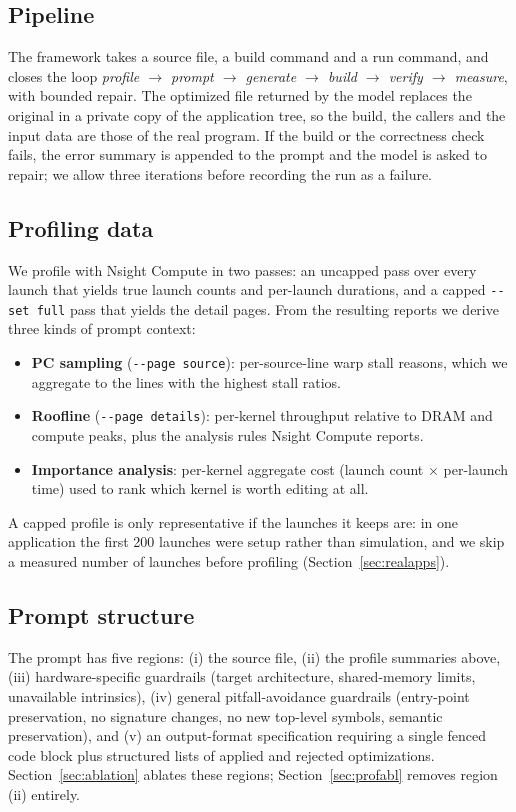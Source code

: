 \subsection{Pipeline}
The framework takes a source file, a build command and a run command, and closes the loop
\emph{profile $\rightarrow$ prompt $\rightarrow$ generate $\rightarrow$ build $\rightarrow$ verify
$\rightarrow$ measure}, with bounded repair. The optimized file returned by the model replaces the
original in a private copy of the application tree, so the build, the callers and the input data are
those of the real program. If the build or the correctness check fails, the error summary is appended
to the prompt and the model is asked to repair; we allow three iterations before recording the run as
a failure.

\subsection{Profiling data}
We profile with Nsight Compute in two passes: an uncapped pass over every launch that yields true
launch counts and per-launch durations, and a capped \texttt{-{}-set full} pass that yields the detail
pages. From the resulting reports we derive three kinds of prompt context:
\begin{itemize}\itemsep2pt
  \item \textbf{PC sampling} (\texttt{-{}-page source}): per-source-line warp stall reasons, which we
    aggregate to the lines with the highest stall ratios.
  \item \textbf{Roofline} (\texttt{-{}-page details}): per-kernel throughput relative to DRAM and compute
    peaks, plus the analysis rules Nsight Compute reports.
  \item \textbf{Importance analysis}: per-kernel aggregate cost (launch count $\times$ per-launch time)
    used to rank which kernel is worth editing at all.
\end{itemize}
A capped profile is only representative if the launches it keeps are: in one application the first 200
launches were setup rather than simulation, and we skip a measured number of launches before profiling
(Section~\ref{sec:realapps}).

\subsection{Prompt structure}
The prompt has five regions: (i) the source file, (ii) the profile summaries above, (iii)
hardware-specific guardrails (target architecture, shared-memory limits, unavailable intrinsics), (iv)
general pitfall-avoidance guardrails (entry-point preservation, no signature changes, no new top-level
symbols, semantic preservation), and (v) an output-format specification requiring a single fenced code
block plus structured lists of applied and rejected optimizations. Section~\ref{sec:ablation} ablates
these regions; Section~\ref{sec:profabl} removes region (ii) entirely.

